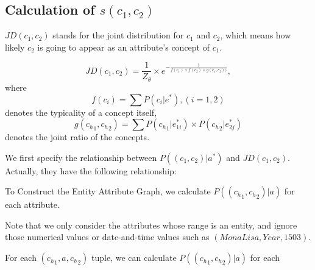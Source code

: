 



\subsection{ Calculation of $s(c_1,c_2)$}


$JD(c_1,c_2)$ stands for the joint distribution for $c_1$ and $c_2$, which means how likely $c_2$ is going to appear as an attribute's concept of $c_1$.

\begin{definition}[Definition of $JD(c_1,c_2)$]

  $$ JD(c_1,c_2) = \frac{1}{Z_\theta}\times e^{- \frac{1}{f(c_1)\times f(c_2)\times g(c_1,c_2))}},$$
  where $$f(c_i)=\sum{ P(c_i|e^*) },(i=1,2)$$
  denotes the typicality of a concept itself, $$g({c_h}_1 ,{c_h}_2 )=\sum P({c_h}_{1}|e_{1i}^*) \times P({c_h}_{2}|e_{2j}^*)$$
  denotes the joint ratio of the concepts.


\end{definition}





We first specify the relationship between $P((c_{1},c_{2})|a^*) $ and $JD(c_1,c_2)$. Actually, they have the following relationship:
\xch{===========================}



To Construct the Entity Attribute Graph, we calculate $P(({c_h}_{1},{c_h}_{2}) |a)$ for each attribute.




Note that we only consider the attributes whose range is an entity, and ignore those numerical values or date-and-time values such as $( Mona Lisa, Year, 1503)$.





For each $({c_h}_{1},a,{c_h}_{2})$ tuple, we can calculate $P(({c_h}_{1},{c_h}_{2}) |a)$ for each









